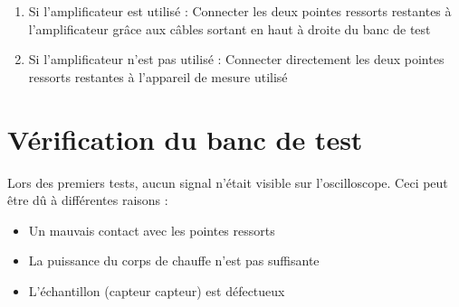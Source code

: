 \begin{enumerate}
          
    \item Si l'amplificateur est utilisé : Connecter les deux pointes ressorts restantes à l'amplificateur grâce aux câbles sortant en haut
          à droite du banc de test\\
          
    \item Si l'amplificateur n'est pas utilisé : Connecter directement les deux pointes ressorts restantes à l'appareil de mesure utilisé
\end{enumerate}

\section{Vérification du banc de test}
Lors des premiers tests, aucun signal n'était visible sur l'oscilloscope. Ceci peut être dû à différentes raisons :
\begin{itemize}
    \item Un mauvais contact avec les pointes ressorts\\
          
    \item La puissance du corps de chauffe n'est pas suffisante\\
          
    \item L'échantillon (capteur \gls{capteur}) est défectueux\\
\end{itemize}

